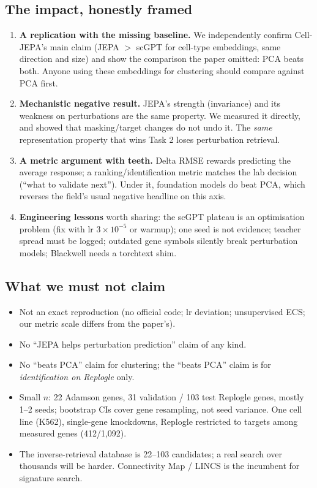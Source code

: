 \documentclass[11pt]{article}
\begin{document}
\subsection{The impact, honestly framed}
\begin{enumerate}
\item \textbf{A replication with the missing baseline.} We independently confirm Cell-JEPA's main claim (JEPA $>$ scGPT for cell-type embeddings, same direction and size) and show the comparison the paper omitted: PCA beats both. Anyone using these embeddings for clustering should compare against PCA first.
\item \textbf{Mechanistic negative result.} JEPA's strength (invariance) and its weakness on perturbations are the same property. We measured it directly, and showed that masking/target changes do not undo it. The \emph{same} representation property that wins Task 2 loses perturbation retrieval.
\item \textbf{A metric argument with teeth.} Delta RMSE rewards predicting the average response; a ranking/identification metric matches the lab decision (``what to validate next''). Under it, foundation models do beat PCA, which reverses the field's usual negative headline on this axis.
\item \textbf{Engineering lessons} worth sharing: the scGPT plateau is an optimisation problem (fix with lr $3\times10^{-5}$ or warmup); one seed is not evidence; teacher spread must be logged; outdated gene symbols silently break perturbation models; Blackwell needs a torchtext shim.
\end{enumerate}

\subsection{What we must not claim}
\begin{itemize}
\item Not an exact reproduction (no official code; lr deviation; unsupervised ECS; our metric scale differs from the paper's).
\item No ``JEPA helps perturbation prediction'' claim of any kind.
\item No ``beats PCA'' claim for clustering; the ``beats PCA'' claim is for \emph{identification on Replogle} only.
\item Small $n$: 22 Adamson genes, 31 validation / 103 test Replogle genes, mostly 1--2 seeds; bootstrap CIs cover gene resampling, not seed variance. One cell line (K562), single-gene knockdowns, Replogle restricted to targets among measured genes (412/1,092).
\item The inverse-retrieval database is 22--103 candidates; a real search over thousands will be harder. Connectivity Map / LINCS is the incumbent for signature search.
\end{itemize}
\end{document}
